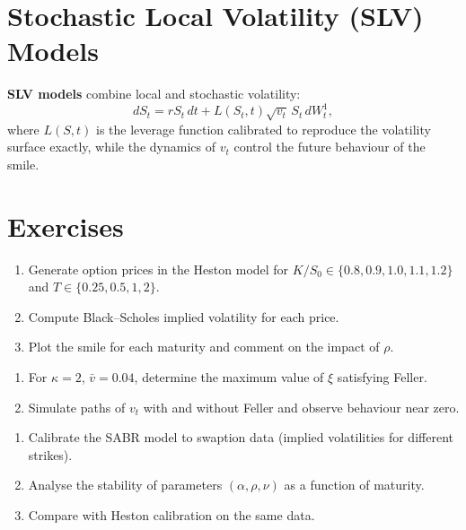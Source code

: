 \section{Stochastic Local Volatility (SLV) Models}

\begin{definition}
\textbf{SLV models} combine local and stochastic volatility:
\[
    dS_t = rS_t\,dt + L(S_t, t)\sqrt{v_t}\,S_t\,dW_t^1,
\]
where $L(S,t)$ is the leverage function calibrated to reproduce the
volatility surface exactly, while the dynamics of $v_t$ control the
future behaviour of the smile.
\end{definition}

\section{Exercises}

\begin{exercise}
\begin{enumerate}
    \item Generate option prices in the Heston model for
          $K/S_0 \in \{0.8, 0.9, 1.0, 1.1, 1.2\}$ and $T \in \{0.25, 0.5, 1, 2\}$.
    \item Compute Black--Scholes implied volatility for each price.
    \item Plot the smile for each maturity and comment on the impact of $\rho$.
\end{enumerate}
\end{exercise}

\begin{exercise}
\begin{enumerate}
    \item For $\kappa = 2$, $\bar{v} = 0.04$, determine the maximum value
          of $\xi$ satisfying Feller.
    \item Simulate paths of $v_t$ with and without Feller and observe
          behaviour near zero.
\end{enumerate}
\end{exercise}

\begin{exercise}
\begin{enumerate}
    \item Calibrate the SABR model to swaption data (implied volatilities
          for different strikes).
    \item Analyse the stability of parameters $(\alpha, \rho, \nu)$ as a
          function of maturity.
    \item Compare with Heston calibration on the same data.
\end{enumerate}
\end{exercise}

